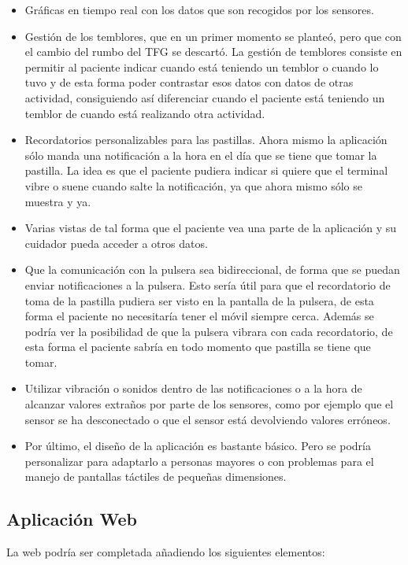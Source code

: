 \documentclass[11pt,spanish]{article}
\begin{document}
\begin{itemize}
	\item Gráficas en tiempo real con los datos que son recogidos por los sensores.
    \item Gestión de los temblores, que en un primer momento se planteó, pero que con el cambio del rumbo del TFG se descartó. La gestión de temblores consiste en permitir al paciente indicar cuando está teniendo un temblor o cuando lo tuvo y de esta forma poder contrastar esos datos con datos de otras actividad, consiguiendo así diferenciar cuando el paciente está teniendo un temblor de cuando está realizando otra actividad.
    \item Recordatorios personalizables para las pastillas. Ahora mismo la aplicación sólo manda una notificación a la hora en el día que se tiene que tomar la pastilla. La idea es que el paciente pudiera indicar si quiere que el terminal vibre o suene cuando salte la notificación, ya que ahora mismo sólo se muestra y ya.
    \item Varias vistas de tal forma que el paciente vea una parte de la aplicación y su cuidador pueda acceder a otros datos.
    \item Que la comunicación con la pulsera sea bidireccional, de forma que se puedan enviar notificaciones a la pulsera. Esto sería útil para que el recordatorio de toma de la pastilla pudiera ser visto en la pantalla de la pulsera, de esta forma el paciente no necesitaría tener el móvil siempre cerca. Además se podría ver la posibilidad de que la pulsera vibrara con cada recordatorio, de esta forma el paciente sabría en todo momento que pastilla se tiene que tomar.
    \item Utilizar vibración o sonidos dentro de las notificaciones o a la hora de alcanzar valores extraños por parte de los sensores, como por ejemplo que el sensor se ha desconectado o que el sensor está devolviendo valores erróneos.
    \item Por último, el diseño de la aplicación es bastante básico. Pero se podría personalizar para adaptarlo a personas mayores o con problemas para el manejo de pantallas táctiles de pequeñas dimensiones.
\end{itemize}

\subsection{Aplicación Web}
La web podría ser completada añadiendo los siguientes elementos:
\end{document}
